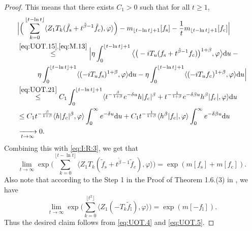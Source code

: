 \documentclass[12pt,a4paper]{amsart}
\theoremstyle{plain}
\theoremstyle{definition}
\numberwithin{equation}{section}
\begin{document}
\begin{proof}
This means that there exists $C_1 >0$ such that for all $t\geq 1$,
\begin{align}
&\Big|\Big(\sum_{k=0}^{\lfloor t-\ln t \rfloor} \langle Z_1T_{k}(\tilde f_\mathrm s+t^{\tilde{\beta}-1}\tilde{f}_c), \varphi\rangle \Big)-m_{\lfloor t-\ln t \rfloor+1}[f_\mathrm s]-\frac{1}{t}m_{\lfloor t-\ln t \rfloor+1}[f_\mathrm c]\Big|
\\& \begin{multlined}
\overset{\eqref{eq:UOT.15},\eqref{eq:M.13}}\leq\Big| \eta \int_0^{\lfloor t-\ln t \rfloor+1}\big\langle \big(-iT_u(f_\mathrm s+t^{\tilde{\beta}-1}f_\mathrm c)\big)^{1+\beta},\varphi \big\rangle \mathrm du - {}
\\ \eta \int_0^{\lfloor t-\ln t \rfloor+1} \langle (-iT_u f_\mathrm s)^{1+\beta}, \varphi \rangle  \mathrm du - \eta \int_0^{\lfloor t-\ln t \rfloor+1} \langle (-iT_u f_\mathrm c)^{1+\beta}, \varphi \rangle  \mathrm du\Big|
\end{multlined}
\\ & \overset{\eqref{eq:UOT.21}}\leq C_1\int_0^{\lfloor t-\ln t \rfloor+1}\langle t^{-\frac{\beta}{1+\beta}}e^{-\delta u}h|f_\mathrm c|^{\beta}+t^{-\frac{1}{1+\beta}}e^{-\delta\beta u}h^{\beta}|f_\mathrm c|, \varphi \rangle \mathrm du
\\& \leq C_1 t^{-\frac{\beta}{1+\beta}} \langle h|f_\mathrm c|^{\beta},\varphi \rangle \int_0^\infty e^{-\delta u} \mathrm du + C_1 t^{-\frac{1}{1+\beta}} \langle h^\beta|f_\mathrm c|,\varphi \rangle \int_0^\infty e^{-\delta \beta u} \mathrm du
\\& \xrightarrow[t\rightarrow \infty]{} 0.
\end{align}
Combining this with \eqref{eq:I:R:3}, we get that
\begin{equation} \label{eq:UOT.4}
\lim_{t\rightarrow \infty}\exp\Big(\sum_{k=0}^{\lfloor t-\ln t \rfloor} \langle Z_1T_{k}(\tilde f_\mathrm s+t^{\tilde{\beta}-1}\tilde{f}_c), \varphi\rangle \Big)  = \exp( m[f_\mathrm s]+m[f_\mathrm c]).
\end{equation}
Also note that according to the Step 1 in the Proof of Theorem 1.6.(3) in \cite{RenSongSunZhao2019Stable}, we have
\begin{equation}\label{eq:UOT.5}
\lim_{t\rightarrow \infty}\exp\Big(\sum_{k=0}^{\lfloor t^2 \rfloor}\langle Z_1(-T_k\tilde{f}_\mathrm l),\varphi\rangle\Big) =\exp(m[-f_\mathrm l]).
\end{equation}
Thus the desired claim follows from \eqref{eq:UOT.4} and \eqref{eq:UOT.5}.
\end{proof}
\end{document}
